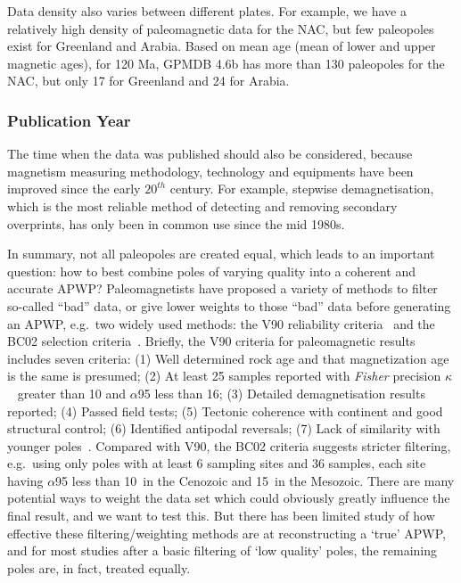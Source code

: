 Data density also varies between different plates. For example, we have a
relatively high density of paleomagnetic data for the NAC, but few paleopoles
exist for Greenland and Arabia. Based on mean age (mean of lower and upper
magnetic ages), for 120 Ma, GPMDB 4.6b has more than 130 paleopoles
for the NAC, but only 17 for Greenland and 24 for Arabia.

\subsubsection{Publication Year}\label{sec:puby}

The time when the data was published should also be considered, because
magnetism measuring methodology, technology and equipments have been improved
since the early $20^{th}$ century. For example, stepwise demagnetisation, which
is the most reliable method of detecting and removing secondary overprints, has
only been in common use since the mid 1980s.

In summary, not all paleopoles are created equal, which leads to an important
question: how to best combine poles of varying quality into a coherent and
accurate APWP\@? Paleomagnetists have proposed a variety of methods to filter
so-called ``bad'' data, or give lower weights to those ``bad'' data before
generating an APWP, e.g.\ two widely used methods: the V90 reliability
criteria~\citep{v90} and the BC02 selection criteria~\citep{B02}. Briefly, the
V90 criteria for paleomagnetic results includes seven criteria: (1) Well
determined rock age and that magnetization age is the same is presumed; (2) At
least 25 samples reported with \emph{Fisher} precision $\kappa$~\citep{F53} greater
than 10 and $\alpha$95 less than 16\degree; (3) Detailed demagnetisation results
reported; (4) Passed field tests; (5) Tectonic coherence with continent and good
structural control; (6) Identified antipodal reversals; (7) Lack of similarity
with younger poles~\citep{T92}. Compared with V90, the BC02 criteria suggests
stricter filtering, e.g.\ using only poles with at least 6 sampling sites and 36
samples, each site having $\alpha$95 less than 10\degree\ in the Cenozoic and
15\degree\ in the Mesozoic. There are many potential ways to weight the data set
which could obviously greatly influence the final result, and we want to test
this. But there has been limited study of how effective these
filtering/weighting methods are at reconstructing a `true' APWP, and for most
studies after a basic filtering of `low quality' poles, the remaining poles are,
in fact, treated equally.


